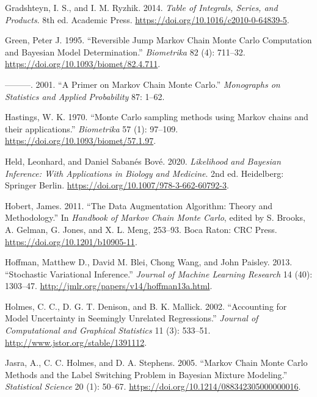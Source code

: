 \documentclass[
  11pt,
  letterpaper,
]{scrbook}
\newlength{\cslhangindent}
\newenvironment{CSLReferences}[2] %
 {\begin{list}{}{%
  \setlength{\itemindent}{0pt}
  \setlength{\leftmargin}{0pt}
  \setlength{\parsep}{0pt}
  \ifodd #1
   \setlength{\leftmargin}{\cslhangindent}
   \setlength{\itemindent}{-1\cslhangindent}
  \fi
  \setlength{\itemsep}{#2\baselineskip}}}
 {\end{list}}
\theoremstyle{plain}
\theoremstyle{plain}
\theoremstyle{definition}
\theoremstyle{definition}
\theoremstyle{definition}
\theoremstyle{plain}
\theoremstyle{remark}
\begin{document}
\begin{CSLReferences}{1}{0}
Gradshteyn, I. S., and I. M. Ryzhik. 2014. \emph{Table of Integrals,
Series, and Products}. 8th ed. Academic Press.
\url{https://doi.org/10.1016/c2010-0-64839-5}.

Green, Peter J. 1995. {``Reversible Jump {M}arkov Chain {M}onte {C}arlo
Computation and {B}ayesian Model Determination.''} \emph{Biometrika} 82
(4): 711--32. \url{https://doi.org/10.1093/biomet/82.4.711}.

---------. 2001. {``A Primer on {M}arkov Chain {M}onte {C}arlo.''}
\emph{Monographs on Statistics and Applied Probability} 87: 1--62.

Hastings, W. K. 1970. {``{Monte {C}arlo sampling methods using {M}arkov
chains and their applications}.''} \emph{Biometrika} 57 (1): 97--109.
\url{https://doi.org/10.1093/biomet/57.1.97}.

Held, Leonhard, and Daniel Sabanés Bové. 2020. \emph{Likelihood and
{B}ayesian Inference: With Applications in Biology and Medicine}. 2nd
ed. Heidelberg: Springer Berlin.
\url{https://doi.org/10.1007/978-3-662-60792-3}.

Hobert, James. 2011. {``The Data Augmentation Algorithm: Theory and
Methodology.''} In \emph{Handbook of {M}arkov Chain {M}onte {C}arlo},
edited by S. Brooks, A. Gelman, G. Jones, and X. L. Meng, 253--93. Boca
Raton: CRC Press. \url{https://doi.org/10.1201/b10905-11}.

Hoffman, Matthew D., David M. Blei, Chong Wang, and John Paisley. 2013.
{``Stochastic Variational Inference.''} \emph{Journal of Machine
Learning Research} 14 (40): 1303--47.
\url{http://jmlr.org/papers/v14/hoffman13a.html}.

Holmes, C. C., D. G. T. Denison, and B. K. Mallick. 2002. {``Accounting
for Model Uncertainty in Seemingly Unrelated Regressions.''}
\emph{Journal of Computational and Graphical Statistics} 11 (3):
533--51. \url{http://www.jstor.org/stable/1391112}.

Jasra, A., C. C. Holmes, and D. A. Stephens. 2005. {``{M}arkov Chain
{M}onte {C}arlo Methods and the Label Switching Problem in {B}ayesian
Mixture Modeling.''} \emph{Statistical Science} 20 (1): 50--67.
\url{https://doi.org/10.1214/088342305000000016}.


\end{CSLReferences}
\end{document}
